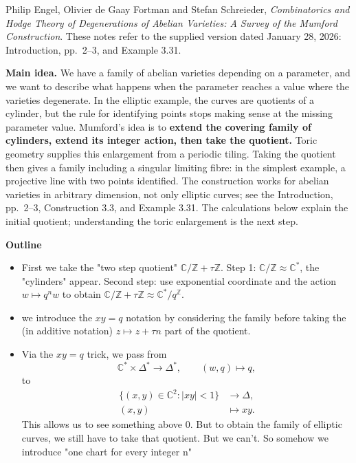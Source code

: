\noindent
Philip Engel, Olivier de Gaay Fortman and
Stefan Schreieder,
\emph{Combinatorics and Hodge Theory of
Degenerations of Abelian Varieties:
A Survey of the Mumford Construction}.
These notes refer to the supplied version
dated January 28, 2026: Introduction,
pp.~2--3, and Example 3.31.

\medskip\noindent
{\bf Main idea.}
We have a family of abelian varieties
depending on a parameter, and we want
to describe what happens when the
parameter reaches a value where the
varieties degenerate. In the elliptic
example, the curves are quotients of a
cylinder, but the rule for identifying
points stops making sense at the missing
parameter value. Mumford's idea is to
{\bf extend the covering family of
cylinders, extend its integer action,
then take the quotient.}
Toric geometry supplies this enlargement
from a periodic tiling. Taking the quotient
then gives a family including a singular
limiting fibre: in the simplest example,
a projective line with two points
identified. The construction works for
abelian varieties in arbitrary dimension,
not only elliptic curves; see the
Introduction, pp.~2--3, Construction 3.3,
and Example 3.31. The calculations below
explain the initial quotient; understanding
the toric enlargement is the next step.

\medskip\noindent
{\bf Outline}
\begin{itemize}
\item First we take the "two step quotient"
$\mathbb{C}/\mathbb{Z}+\tau\mathbb{Z}$.
Step 1:
$\mathbb{C}/\mathbb{Z}\approx\mathbb{C}^*$,
the "cylinders" appear. Second step: use
exponential coordinate and the action
$w\mapsto q^nw$ to obtain
$\mathbb{C}/\mathbb{Z}+\tau\mathbb{Z}
\approx\mathbb{C}^{\ast}/q^{\mathbb{Z}}$.
\item we introduce the $xy=q$ notation by
considering the family before taking the
(in additive notation) $z\mapsto z+\tau n$
part of the quotient.
\item Via the $xy=q$ trick, we pass from
$$
\mathbb{C}^{\ast}\times\Delta^{\ast}
\longrightarrow\Delta^{\ast},
\qquad (w,q)\longmapsto q,
$$
to
$$
\begin{aligned}
\{(x,y)\in\mathbb{C}^2:|xy|<1\}
&\longrightarrow\Delta,\\
(x,y)&\longmapsto xy.
\end{aligned}
$$
This allows us to see something
above 0. But to obtain the family of
elliptic curves, we still have to take
that quotient. But we can't. So somehow
we introduce "one chart for every
integer n"
\end{itemize}

